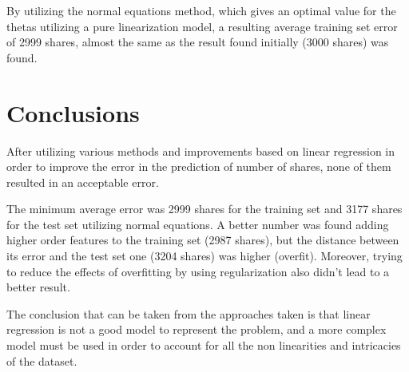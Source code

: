 \documentclass[10pt,twocolumn,letterpaper]{article}
\begin{document}
By utilizing the normal equations method, which gives an optimal value for the thetas utilizing a pure linearization model, a resulting average training set error of 2999 shares, almost the same as the result found initially (3000 shares) was found.

\section{Conclusions}

After utilizing various methods and improvements based on linear regression in order to improve the error in the prediction of number of shares, none of them resulted in an acceptable error. 

The minimum average error was 2999 shares for the training set and 3177 shares for the test set utilizing normal equations. A better number was found adding higher order features to the training set (2987 shares), but the distance between its error and the test set one (3204 shares) was higher (overfit). Moreover, trying to reduce the effects of overfitting by using regularization also didn't lead to a better result.

The conclusion that can be taken from the approaches taken is that linear regression is not a good model to represent the problem, and a more complex model must be used in order to account for all the non linearities and intricacies of the dataset.

{\small


}
\end{document}

